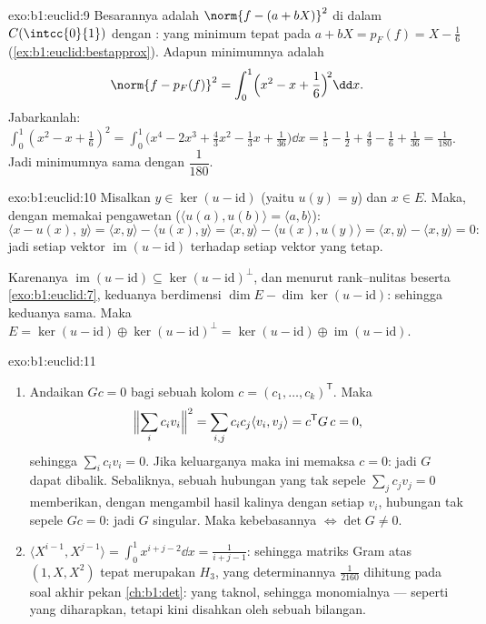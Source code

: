 \begin{solution}{exo:b1:euclid:9}
Besarannya adalah $\norm{f - (a + bX)}^2$ di dalam $C(\intcc{0}{1})$ dengan
 : yang minimum tepat pada  $a + bX = p_F(f) = X - \frac16$
(\cref{ex:b1:euclid:bestapprox}). Adapun minimumnya adalah
\[
\norm{f - p_F(f)}^2 = \int_0^1 \Bigl(x^2 - x + \frac16\Bigr)^{\!2}
\dd x .
\]
Jabarkanlah: $\int_0^1 (x^2 - x + \frac16)^2 = \int_0^1 \bigl(x^4 - 2x^3
+ \frac{4}{3}x^2 - \frac13 x + \frac{1}{36}\bigr)\dd x = \frac15 -
\frac12 + \frac49 - \frac16 + \frac{1}{36} = \frac{1}{180}$.
Jadi minimumnya sama dengan $\dfrac{1}{180}$.
\end{solution}

\begin{solution}{exo:b1:euclid:10}
Misalkan $y \in \ker(u - \mathrm{id})$ (yaitu $u(y) = y$) dan $x \in E$.
Maka, dengan memakai pengawetan  ($\langle u(a),
u(b)\rangle = \langle a, b\rangle$):
\[
\langle x - u(x),\, y\rangle
= \langle x, y\rangle - \langle u(x), y\rangle
= \langle x, y\rangle - \langle u(x), u(y)\rangle
= \langle x, y\rangle - \langle x, y\rangle = 0 :
\]
jadi setiap vektor $\operatorname{im}(u - \mathrm{id})$ 
terhadap setiap vektor yang tetap.

Karenanya $\operatorname{im}(u - \mathrm{id}) \subseteq \ker(u -
\mathrm{id})^{\perp}$, dan menurut rank--nulitas beserta
\cref{exo:b1:euclid:7}, keduanya berdimensi $\dim E - \dim\ker(u -
\mathrm{id})$: sehingga keduanya sama. Maka $E = \ker(u - \mathrm{id})
\oplus \ker(u - \mathrm{id})^\perp = \ker(u - \mathrm{id}) \oplus
\operatorname{im}(u - \mathrm{id})$.
\end{solution}

\begin{solution}{exo:b1:euclid:11}
\begin{enumerate}
  \item Andaikan $Gc = 0$ bagi sebuah kolom $c = (c_1, \dots,
        c_k)^{\mathsf T}$. Maka
        \[
        \Bigl\lVert\sum_i c_i v_i\Bigr\rVert^2
        = \sum_{i,j} c_i c_j \langle v_i, v_j\rangle
        = c^{\mathsf T} G\, c = 0,
        \]
        sehingga $\sum_i c_i v_i = 0$. Jika keluarganya  maka ini
        memaksa $c = 0$: jadi $G$ dapat dibalik. Sebaliknya, sebuah
        hubungan yang tak sepele $\sum_j c_j v_j = 0$ memberikan, dengan mengambil
        hasil kalinya dengan setiap $v_i$, hubungan tak sepele
        $Gc = 0$: jadi $G$ singular. Maka kebebasannya $\iff \det G \neq 0$.
  \item $\langle X^{i-1}, X^{j-1}\rangle = \int_0^1 x^{i+j-2}\dd
        x = \frac{1}{i+j-1}$: sehingga matriks Gram atas $(1, X, X^2)$
        tepat merupakan  $H_3$, yang determinannya
        $\frac1{2160}$ dihitung pada soal akhir pekan
        \cref{ch:b1:det}: yang taknol, sehingga monomialnya  ---
        seperti yang diharapkan, tetapi kini disahkan oleh sebuah bilangan.
\end{enumerate}
\end{solution}

